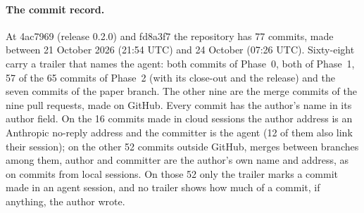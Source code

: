 \paragraph{The commit record.}
At  4ac7969 (release 0.2.0) and  fd8a3f7 the repository has 77
commits, made between 21 October 2026 (21:54 UTC) and 24 October (07:26 UTC).
Sixty-eight carry a  trailer that names the agent: both commits of Phase~0,
both of Phase~1, 57 of the 65 commits of Phase~2 (with its close-out and the release) and the seven
commits of the paper branch.
The other nine are the merge commits of the nine pull requests, made on GitHub.
Every commit has the author's name in its author field.
On the 16 commits made in cloud sessions the author address is an Anthropic no-reply address and the
committer is the agent (12 of them also link their session); on the other 52 commits outside GitHub,
merges between branches among them, author and committer are the author's own name and address, as
on commits from local sessions.
On those 52 only the trailer marks a commit made in an agent session, and no trailer shows how much
of a commit, if anything, the author wrote.

